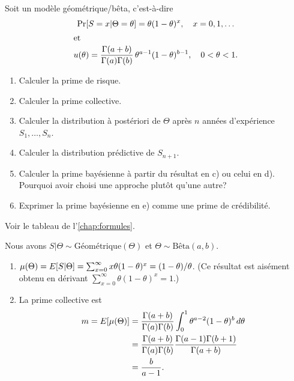 
\begin{exercice}
  \label{exercice:bayesienne:geometrique-beta}
  Soit un modèle géométrique/bêta, c'est-à-dire
  \begin{gather*}
    \Pr[S = x|\Theta = \theta]
    = \theta (1 - \theta)^x,   \quad x = 0, 1, \dots \\
    \intertext{et}
    u(\theta)
    = \frac{\Gamma(a + b)}{\Gamma(a) \Gamma(b)}\,
       \theta^{a-1} (1 - \theta)^{b-1}, \quad 0 < \theta < 1.
  \end{gather*}
  \begin{enumerate}
  \item Calculer la prime de risque.
  \item Calculer la prime collective.
  \item Calculer la distribution à postériori de $\Theta$ après $n$
    années d'expérience $S_1, \dots, S_n$.
  \item Calculer la distribution prédictive de $S_{n+1}$.
  \item Calculer la prime bayésienne à partir du résultat en c) ou
    celui en d). Pourquoi avoir choisi une approche plutôt qu'une
    autre?
  \item Exprimer la prime bayésienne en e) comme une prime de
    crédibilité.
  \end{enumerate}
  \begin{rep}
    Voir le tableau de l'\autoref{chap:formules}.
  \end{rep}
  \begin{sol}
    Nous avons $S|\Theta \sim \text{Géométrique}(\Theta)$ et
    $\Theta \sim \text{Bêta}(a, b)$.
    \begin{enumerate}
    \item $\mu(\Theta) = E [ S|\Theta ] = \sum_{x=0}^\infty x \theta
      (1 - \theta)^x = (1 - \theta)/\theta$. (Ce résultat est aisément
      obtenu en dérivant $\sum_{x=0}^\infty \theta (1 - \theta)^x =
      1$.)
    \item La prime collective est
      \begin{align*}
        m = E [ \mu(\Theta) ]
        &= \frac{\Gamma(a +
          b)}{\Gamma(a) \Gamma(b)}
        \int_0^1 \theta^{a - 2} (1 - \theta)^b\, d\theta \\
        &= \frac{\Gamma(a + b)}{\Gamma(a) \Gamma(b)}
        \frac{\Gamma(a - 1) \Gamma(b + 1)}{\Gamma(a +
          b)} \\
        &= \frac{b}{a - 1}.
      \end{align*}

\end{enumerate}
\end{sol}
\end{exercice}
